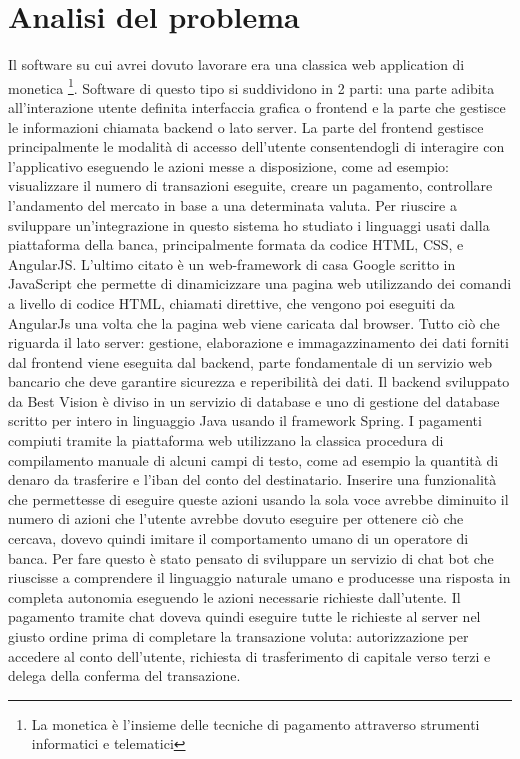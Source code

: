 \section{Analisi del problema}
Il software su cui avrei dovuto lavorare era una classica web application di monetica \footnote{La monetica è l'insieme delle tecniche di pagamento attraverso strumenti informatici e telematici}. Software di questo tipo si suddividono in 2 parti: una parte adibita all'interazione utente definita interfaccia grafica o frontend e la parte che gestisce le informazioni chiamata backend o lato server.
La parte del frontend gestisce principalmente le modalità di accesso dell'utente consentendogli di interagire con l'applicativo eseguendo le azioni messe a disposizione, come ad esempio: visualizzare il numero di transazioni eseguite, creare un pagamento, controllare l'andamento del mercato in base a una determinata valuta.
Per riuscire a sviluppare un'integrazione in questo sistema ho studiato i linguaggi usati dalla piattaforma della banca, principalmente formata da codice HTML, CSS, e AngularJS.
L'ultimo citato è un web-framework di casa Google scritto in JavaScript che permette di dinamicizzare una pagina web utilizzando dei comandi a livello di codice HTML, chiamati direttive, che vengono poi eseguiti da AngularJs una volta che la pagina web viene caricata dal browser.
Tutto ciò che riguarda il lato server: gestione, elaborazione e immagazzinamento dei dati forniti dal frontend viene eseguita dal backend, parte fondamentale di un servizio web bancario che deve garantire sicurezza e reperibilità dei dati. Il backend sviluppato da Best Vision è diviso in un servizio di database e uno di gestione del database scritto per intero in linguaggio Java usando il framework Spring.
I pagamenti compiuti tramite la piattaforma web utilizzano la classica procedura di compilamento manuale di alcuni campi di testo, come ad esempio la quantità di denaro da trasferire e l'iban del conto del destinatario.
Inserire una funzionalità che permettesse di eseguire queste azioni usando la sola voce avrebbe diminuito il numero di azioni che l'utente avrebbe dovuto eseguire per ottenere ciò che cercava, dovevo quindi imitare il comportamento umano di un operatore di banca. Per fare questo è stato pensato di sviluppare un servizio di chat bot che riuscisse a comprendere il linguaggio naturale umano e producesse una risposta in completa autonomia eseguendo le azioni necessarie richieste dall'utente.
Il pagamento tramite chat doveva quindi eseguire tutte le richieste al server nel giusto ordine prima di completare la transazione voluta: autorizzazione per accedere al conto dell'utente, richiesta di trasferimento di capitale verso terzi e delega della conferma del transazione.
